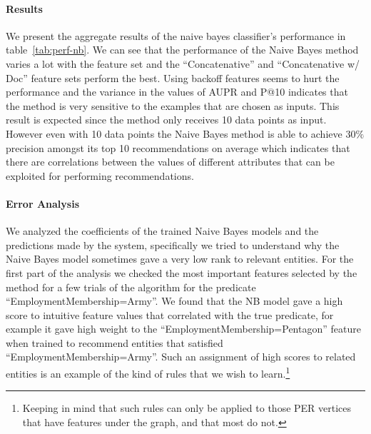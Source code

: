 \documentclass[paper=a4,fontsize=11pt]{scrartcl}
\newcommand{\tabref}[1]{table~\ref{#1}}
\numberwithin{equation}{section}    %
\numberwithin{figure}{section}      %
\numberwithin{table}{section}       %
\begin{document}
\paragraph{Results} We present the aggregate results of the naive bayes classifier's performance in \tabref{tab:perf-nb}.
We can see that the performance of the Naive Bayes method varies a lot with the feature set
and the ``Concatenative'' and ``Concatenative w/ Doc'' feature sets perform the best.
Using backoff features seems to hurt the performance and
the variance in the values of AUPR and P@10 indicates that the method is very sensitive to
the examples that are chosen as inputs. This result is expected since the method only receives 10 data points as input.
However even with 10 data points the Naive Bayes method is able to achieve $30\%$ precision amongst its top 10
recommendations on average which indicates that there are correlations between the values of different attributes
that can be exploited for performing recommendations.

\begin{table}[htbp]
  \centering
  \caption{Performance(\%) with NB with 90\% confidence intervals.}
  \label{tab:perf-nb}
\end{table}

\paragraph{Error Analysis}
We analyzed the coefficients of the trained Naive Bayes models and the predictions made by the system, specifically we tried to understand why the Naive Bayes model sometimes gave a very low rank to relevant entities.
For the first part of the analysis we checked the most important features selected by the method for
a few trials of the algorithm for the predicate ``EmploymentMembership=Army''.
We found that the NB model gave a high score to intuitive feature
values that correlated with the true predicate, for example it gave high weight to the ``EmploymentMembership=Pentagon''
feature when trained to recommend entities that satisfied ``EmploymentMembership=Army''.
Such an assignment of high scores to related entities is an example of the kind of
rules that we wish to learn.\footnote{Keeping in mind that such rules can only be applied to those
  \textsc{PER} vertices that have features under the graph, and that most do not.}
\end{document}
